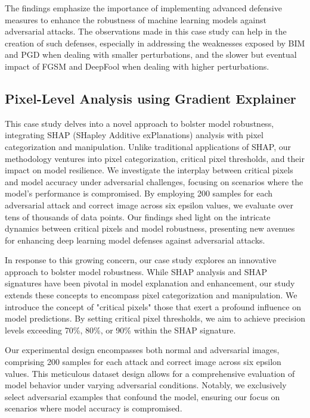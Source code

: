 \documentclass[10pt, conference, a4paper, final]{IEEEtran}
\begin{document}
The findings emphasize the importance of implementing advanced defensive measures to enhance the robustness of machine learning models against 
adversarial attacks. The observations made in this case study can help in the creation of such defenses, especially in addressing the weaknesses exposed by BIM and PGD when dealing with smaller perturbations, and the slower but eventual impact of FGSM and DeepFool when dealing with higher perturbations.


\subsection{Pixel-Level Analysis using Gradient Explainer}
 
  This case study delves into a novel approach to bolster model robustness, integrating SHAP (SHapley Additive exPlanations) analysis with pixel categorization and manipulation. Unlike traditional applications of SHAP, our methodology ventures into pixel categorization, critical pixel thresholds, and their impact on model resilience. We investigate the interplay between critical pixels and model accuracy under adversarial challenges, focusing on scenarios where the model's performance is compromised. By employing 200 samples for each adversarial attack and correct image across six epsilon values, we evaluate over tens of thousands of data points. Our findings shed light on the intricate dynamics between critical pixels and model robustness, presenting new avenues for enhancing deep learning model defenses against adversarial attacks.

  In response to this growing concern, our case study explores an innovative approach to bolster model robustness. While SHAP analysis and SHAP signatures have been pivotal in model explanation and enhancement, our study extends these concepts to encompass pixel categorization and manipulation. We introduce the concept of "critical pixels" those that exert a profound influence on model predictions. By setting critical pixel thresholds, we aim to achieve precision levels exceeding 70\%, 80\%, or 90\% within the SHAP signature.

  Our experimental design encompasses both normal and adversarial images, comprising 200 samples for each attack and correct image across six epsilon values. This meticulous dataset design allows for a comprehensive evaluation of model behavior under varying adversarial conditions. Notably, we exclusively select adversarial examples that confound the model, ensuring our focus on scenarios where model accuracy is compromised.
  
\end{document}
